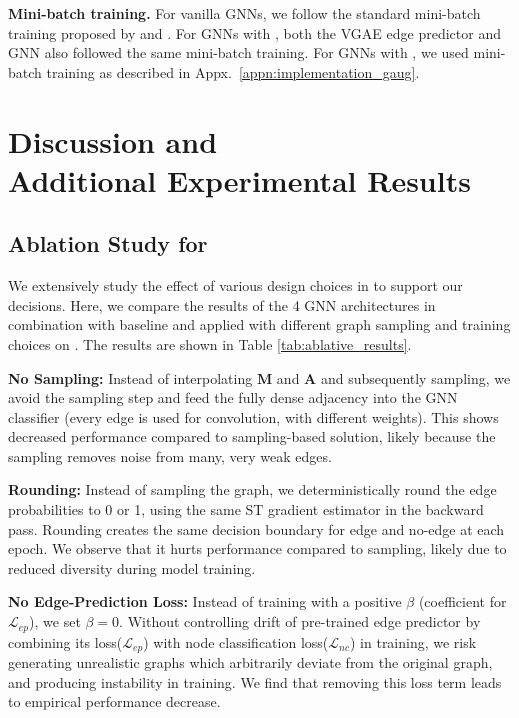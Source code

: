 \documentclass[letterpaper]{article} \usepackage{aaai21}  \usepackage{times}  \usepackage{helvet} \usepackage{courier}  \usepackage[hyphens]{url}  \usepackage{graphicx} \urlstyle{rm} \def\UrlFont{\rm}  \usepackage{natbib}  \usepackage{caption} \frenchspacing  \setlength{\pdfpagewidth}{8.5in}  \setlength{\pdfpageheight}{11in}
\begin{document}
\noindent \textbf{Mini-batch training.} For vanilla GNNs, we follow the standard mini-batch training proposed by \citet{hamilton2017inductive} and \citet{ying2018graph}. For GNNs with \methodtwo, both the VGAE edge predictor and GNN also followed the same mini-batch training. For GNNs with \method, we used mini-batch training as described in Appx.~\ref{appn:implementation_gaug}.

\section{Discussion and \\ Additional Experimental Results}
\label{appn:discussion}

\subsection{Ablation Study for \method}
\label{sec:ablation}
We extensively study the effect of various design choices in \method to support our decisions. Here, we compare the results of the 4 GNN architectures in combination with baseline and \method applied with different graph sampling and training choices on \cora.  The results are shown in Table \ref{tab:ablative_results}. 

\noindent \textbf{No Sampling:} Instead of interpolating $\mathbf{M}$ and $\mathbf{A}$ and subsequently sampling, we avoid the sampling step and feed the fully dense adjacency into the GNN classifier (every edge is used for convolution, with different weights).  This shows decreased  performance compared to sampling-based solution, likely because the sampling removes noise from many, very weak edges.

\noindent \textbf{Rounding:} Instead of sampling the graph, we deterministically round the edge probabilities to 0 or 1, using the same ST gradient estimator in the backward pass.  Rounding creates the same decision boundary for edge and no-edge at each epoch.  We observe that it hurts performance compared to sampling, likely due to reduced diversity during model training.  

\noindent \textbf{No Edge-Prediction Loss:} Instead of training \method with a positive $\beta$ (coefficient for $\mathcal{L}_{ep}$), we set $\beta = 0$.  Without controlling drift of pre-trained edge predictor by combining its loss($\mathcal{L}_{ep}$) with node classification loss($\mathcal{L}_{nc}$)  in training, we risk generating unrealistic graphs which arbitrarily deviate from the original graph, and producing instability in training.  We find that removing this loss term leads to empirical performance decrease.
\end{document}
